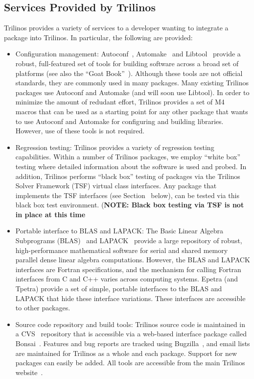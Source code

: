 \documentclass[12pt,strict]{SANDreport}
\begin{document}
\subsection{Services Provided by Trilinos}

Trilinos provides a variety of services to a developer wanting to
integrate a package into Trilinos.  In particular, the following are
provided:
\begin{itemize}
\item Configuration management:
Autoconf~\cite{Autoconf},  Automake~\cite{Automake} and
Libtool~\cite{Libtool} provide a robust, full-featured set of tools for
building software across a broad set of platforms (see also the ``Goat
Book''~\cite{GoatBook}).  Although these
tools are not official standards, they are commonly used in many
packages.  Many existing
Trilinos packages use Autoconf and Automake (and will soon use
Libtool). In order to
minimize the amount of redudant effort, Trilinos provides a set of
M4~\cite{M4} macros that can be used as a starting point for any other
package that wants to use Autoconf and Automake for configuring and
building libraries.  However, use of these tools is not required.

\item Regression testing: Trilinos provides a variety of regression
testing capabilities.  Within a number of Trilinos packages, we employ
``white box'' testing where detailed information about the software is
used and probed.  In addition, Trilinos performs ``black box'' testing
of packages via the Trilinos Solver Framework (TSF) virtual class
interfaces.  Any package that implements the TSF interfaces (see
Section~\cite{Interop_TSF} below), can be tested via this black box
test environment.  ({\bf NOTE: Black box testing via TSF is not in
place at this time}


\item Portable interface to BLAS and LAPACK: The Basic Linear Algebra
Subprograms (BLAS)~\cite{BLAS1,BLAS2,BLAS3} and LAPACK~\cite{lapack}
provide a large repository of robust, high-performance mathematical
software for serial and shared memory parallel dense linear algebra
computations.  However, the BLAS and LAPACK interfaces are Fortran
specifications, and the mechanism for calling Fortran interfaces from
C and C++ varies across computing systems.  Epetra (and Tpetra)
provide a set of simple, portable interfaces to the BLAS and LAPACK
that hide these interface variations.  These interfaces are accessible to
other packages.

\item Source code repository and build tools: Trilinos source code is
maintained in a CVS~\cite{CVS} repository that is accessible via a
web-based interface package called Bonsai~\cite{Bonsai}.  Features and bug reports
are tracked using Bugzilla~\cite{Bugzilla}, and email lists are
maintained for Trilinos as a whole and each package.  Support for new
packages can easily be added.  All tools are accessible from the main
Trilinos website~\cite{Trilinos-home-page}.

\end{itemize}
\end{document}
